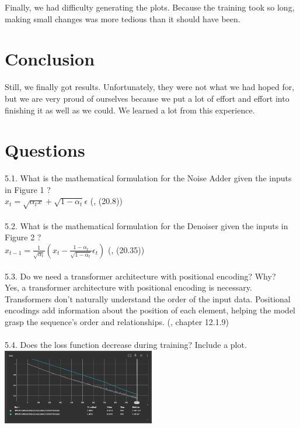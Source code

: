 \documentclass[10pt,a4paper,twocolumn]{article}
\begin{document}
{Finally, we had difficulty generating the plots. Because the training took so long, making small changes was more tedious than it should have been.

\section{Conclusion}
Still, we finally got results. Unfortunately, they were not what we had hoped for, but we are very proud of ourselves because we put a lot of effort and effort into finishing it as well as we could. We learned a lot from this experience.

\section{Questions}
5.1. What is the mathematical formulation for the Noise Adder given the inputs in Figure 1 \cite{grabocka2024diffusers}?\\
\(x_t = \sqrt{\alpha_t x} + \sqrt{1-\alpha_t}\epsilon\) (\cite{bishop2024deeplearning}, (20.8))
\\\\5.2. What is the mathematical formulation for the Denoiser given the inputs in Figure 2 \cite{grabocka2024diffusers}?\\
\(x_{t-1} = \frac{1}{\sqrt{\alpha_t}} (x_t - \frac{1-\alpha_t}{\sqrt{1-\alpha_t}}\epsilon_t)\) (\cite{bishop2024deeplearning}, (20.35))
\\\\5.3. Do we need a transformer architecture with positional encoding? Why?\\
Yes, a transformer architecture with positional encoding is necessary. Transformers don't naturally understand the order of the input data. Positional encodings add information about the position of each element, helping the model grasp the sequence's order and relationships. (\cite{bishop2024deeplearning}, chapter 12.1.9)
\\\\5.4. Does the loss function decrease during training? Include a plot.\\
\includegraphics[width=0.5\textwidth]{img/loss.png} \\
}
\end{document}
